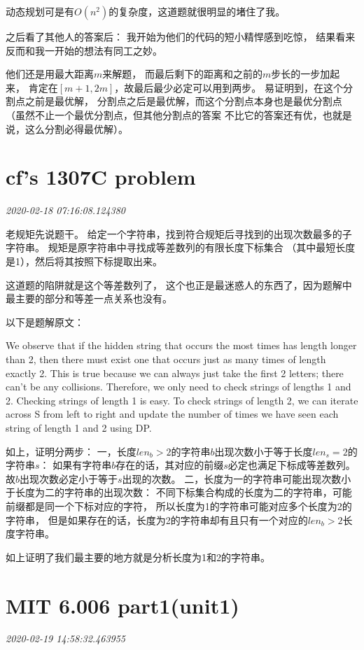 \documentclass{peterlitsdoc}
\newcommand{\timetx}[1]
    {\par\noindent\emph{\pltgray\small #1}\vspace{2em}}
\begin{document}
动态规划可是有$O(n^2)$的复杂度，这道题就很明显的堵住了我。

之后看了其他人的答案后：
我开始为他们的代码的短小精悍感到吃惊，
结果看来反而和我一开始的想法有同工之妙。

他们还是用最大距离$m$来解题，
而最后剩下的距离和之前的$m$步长的一步加起来，
肯定在$[m+1, 2m]$，故最后最少必定可以用到两步。
易证明到，在这个分割点之前是最优解，
分割点之后是最优解，而这个分割点本身也是最优分割点
（虽然不止一个最优分割点，但其他分割点的答案
不比它的答案还有优，也就是说，这么分割必得最优解）。


\section{cf's 1307C problem}\timetx{2020-02-18 07:16:08.124380}

老规矩先说题干。
给定一个字符串，找到符合规矩后寻找到的出现次数最多的子字符串。
规矩是原字符串中寻找成等差数列的有限长度下标集合
（其中最短长度是1），然后将其按照下标提取出来。

这道题的陷阱就是这个等差数列了，
这个也正是最迷惑人的东西了，因为题解中最主要的部分和等差一点关系也没有。

以下是题解原文：

We observe that if the hidden string that occurs the most times has length
longer than 2, then there must exist one that occurs just as many times of
length exactly 2. This is true because we can always just take the first 2
letters; there can't be any collisions. Therefore, we only need to check strings
of lengths 1 and 2. Checking strings of length 1 is easy. To check strings of
length 2, we can iterate across S from left to right and update the number of
times we have seen each string of length 1 and 2 using DP.

如上，证明分两步：
一，长度$len_b>2$的字符串$b$出现次数小于等于长度$len_s=2$的字符串$s$：
如果有字符串$b$存在的话，其对应的前缀$s$必定也满足下标成等差数列。
故$b$出现次数必定小于等于$s$出现的次数。
二，长度为一的字符串可能出现次数小于长度为二的字符串的出现次数：
不同下标集合构成的长度为二的字符串，可能前缀都是同一个下标对应的字符，
所以长度为1的字符串可能对应多个长度为2的字符串，
但是如果存在的话，长度为2的字符串却有且只有一个对应的$len_b>2$长度字符串。

如上证明了我们最主要的地方就是分析长度为1和2的字符串。


\section{MIT 6.006 part1(unit1)}\timetx{2020-02-19 14:58:32.463955}
\end{document}
